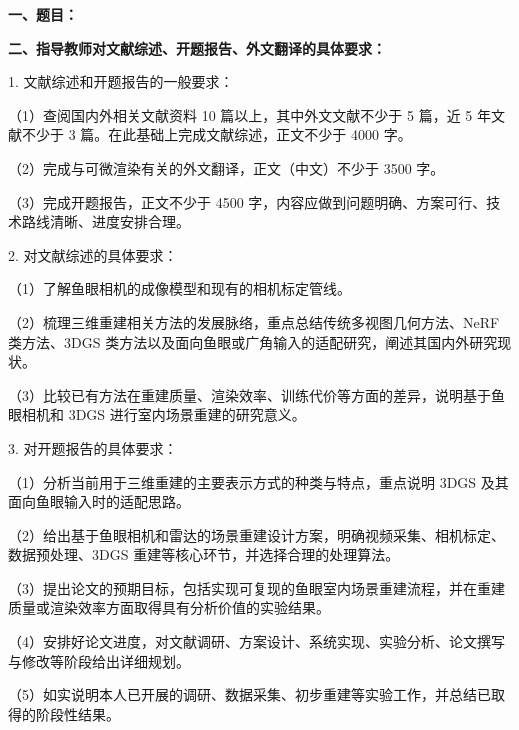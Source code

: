 {
    \setlength{\parindent}{0em}
    \par {\bfseries 一、题目：\Title}
    \\
    \par {\bfseries 二、指导教师对文献综述、开题报告、外文翻译的具体要求：}
    \vspace{0.8em}

    {
    \par 1. 文献综述和开题报告的一般要求：
    \par （1）查阅国内外相关文献资料 10 篇以上，其中外文文献不少于 5 篇，近 5 年文献不少于 3 篇。在此基础上完成文献综述，正文不少于 4000 字。
    \par （2）完成与可微渲染有关的外文翻译，正文（中文）不少于 3500 字。
    \par （3）完成开题报告，正文不少于 4500 字，内容应做到问题明确、方案可行、技术路线清晰、进度安排合理。

    \vspace{0.6em}
    \par 2. 对文献综述的具体要求：
    \par （1）了解鱼眼相机的成像模型和现有的相机标定管线。
    \par （2）梳理三维重建相关方法的发展脉络，重点总结传统多视图几何方法、NeRF 类方法、3DGS 类方法以及面向鱼眼或广角输入的适配研究，阐述其国内外研究现状。
    \par （3）比较已有方法在重建质量、渲染效率、训练代价等方面的差异，说明基于鱼眼相机和 3DGS 进行室内场景重建的研究意义。

    \vspace{0.6em}
    \par 3. 对开题报告的具体要求：
    \par （1）分析当前用于三维重建的主要表示方式的种类与特点，重点说明 3DGS 及其面向鱼眼输入时的适配思路。
    \par （2）给出基于鱼眼相机和雷达的场景重建设计方案，明确视频采集、相机标定、数据预处理、3DGS 重建等核心环节，并选择合理的处理算法。
    \par （3）提出论文的预期目标，包括实现可复现的鱼眼室内场景重建流程，并在重建质量或渲染效率方面取得具有分析价值的实验结果。
    \par （4）安排好论文进度，对文献调研、方案设计、系统实现、实验分析、论文撰写与修改等阶段给出详细规划。
    \par （5）如实说明本人已开展的调研、数据采集、初步重建等实验工作，并总结已取得的阶段性结果。}
}

\mbox{} \vfill

\signature{指导教师（签名）}
